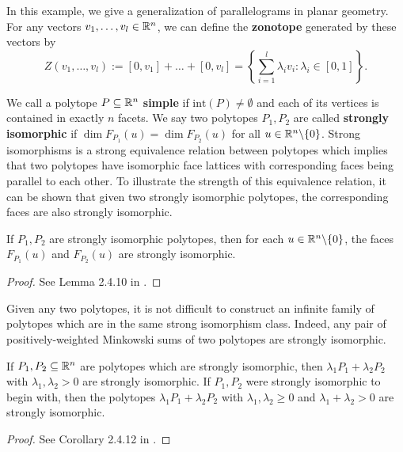 \documentclass{puthesis-UG}
\begin{document}
\begin{example}[Zonotope] \label{zonotope-example}
	In this example, we give a generalization of parallelograms in planar geometry. For any vectors $v_1, \ldots, v_l \in \mathbb{R}^n$, we can define the \textbf{zonotope} generated by these vectors by 
	\[
		Z(v_1, \ldots, v_l) := [0, v_1] + \ldots + [0, v_l] = \left \{ \sum_{i = 1}^l \lambda_i v_i : \lambda_i \in [0, 1] \right \}.
	\]
\end{example}
We call a polytope $P \subseteq \mathbb{R}^n$ \textbf{simple} if $\text{int} (P) \neq \emptyset$ and each of its vertices is contained in exactly $n$ facets. We say two polytopes $P_1, P_2$ are called \textbf{strongly isomorphic} if $\dim F_{P_1}(u) = \dim F_{P_2}(u)$ for all $u \in \mathbb{R}^n \backslash \{0\}$. Strong isomorphisms is a strong equivalence relation between polytopes which implies that two polytopes have isomorphic face lattices with corresponding faces being parallel to each other. To illustrate the strength of this equivalence relation, it can be shown that given two strongly isomorphic polytopes, the corresponding faces are also strongly isomorphic. 

\begin{lem} \label{family-of-strongly-isomorphic}
	If $P_1, P_2$ are strongly isomorphic polytopes, then for each $u \in \mathbb{R}^n \backslash \{0\}$, the faces $F_{P_1}(u)$ and $F_{P_2}(u)$ are strongly isomorphic. 
\end{lem}
\begin{proof}
	See Lemma 2.4.10 in \cite{schneider_2013}. 
\end{proof}

Given any two polytopes, it is not difficult to construct an infinite family of polytopes which are in the same strong isomorphism class. Indeed, any pair of positively-weighted Minkowski sums of two polytopes are strongly isomorphic. 

\begin{prop} \label{families-of-strongly-isomorphic}
	If $P_1, P_2 \subseteq \mathbb{R}^n$ are polytopes which are strongly isomorphic, then $\lambda_1 P_1 + \lambda_2 P_2$ with $\lambda_1, \lambda_2 > 0$ are strongly isomorphic. If $P_1, P_2$ were strongly isomorphic to begin with, then the polytopes $\lambda_1 P_1 + \lambda_2 P_2$ with $\lambda_1, \lambda_2 \geq 0$ and $\lambda_1 + \lambda_2 > 0$ are strongly isomorphic. 
\end{prop}

\begin{proof}
	See Corollary 2.4.12 in \cite{schneider_2013}.
\end{proof}
\end{document}
